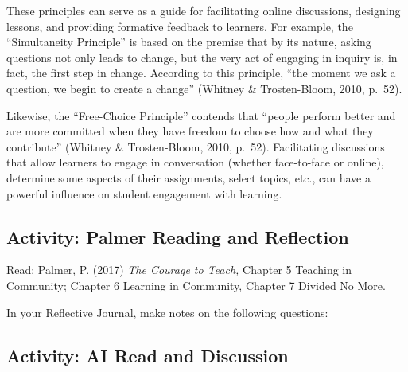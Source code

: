 \documentclass[
]{book}
\providecommand{\tightlist}{%
  \setlength{\itemsep}{0pt}\setlength{\parskip}{0pt}}
\begin{document}
These principles can serve as a guide for facilitating online discussions, designing lessons, and providing formative feedback to learners. For example, the ``Simultaneity Principle'' is based on the premise that by its nature, asking questions not only leads to change, but the very act of engaging in inquiry is, in fact, the first step in change. According to this principle, ``the moment we ask a question, we begin to create a change'' (Whitney \& Trosten-Bloom, 2010, p.~52).

Likewise, the ``Free-Choice Principle'' contends that ``people perform better and are more committed when they have freedom to choose how and what they contribute'' (Whitney \& Trosten-Bloom, 2010, p.~52). Facilitating discussions that allow learners to engage in conversation (whether face-to-face or online), determine some aspects of their assignments, select topics, etc., can have a powerful influence on student engagement with learning.

\hypertarget{activity-palmer-reading-and-reflection-2}{%
\subsection{Activity: Palmer Reading and Reflection}\label{activity-palmer-reading-and-reflection-2}}

\begin{reflect}
Read: Palmer, P. (2017) \emph{The Courage to Teach,} Chapter 5 Teaching
in Community; Chapter 6 Learning in Community, Chapter 7 Divided No
More.

In your Reflective Journal, make notes on the following questions:

\end{reflect}

\hypertarget{activity-ai-read-and-discussion}{%
\subsection{Activity: AI Read and Discussion}\label{activity-ai-read-and-discussion}}
\end{document}
